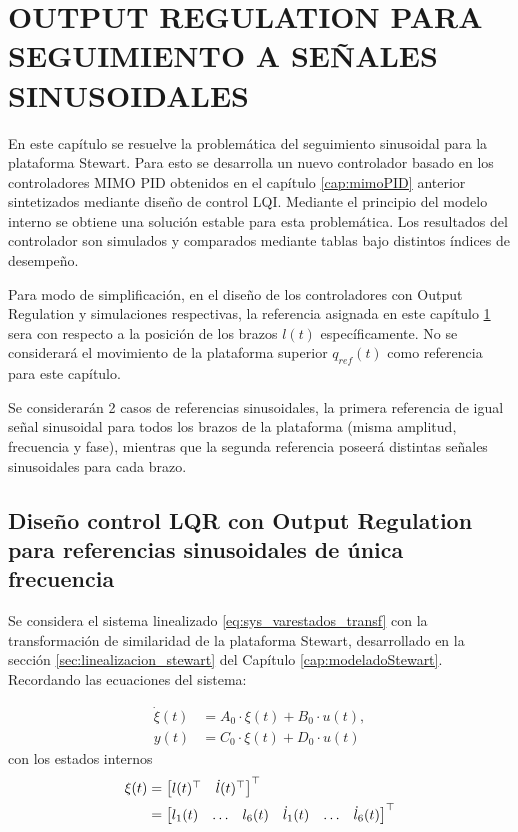 \chapter{OUTPUT REGULATION PARA SEGUIMIENTO A SEÑALES SINUSOIDALES}
\label{cap:OutputRegulation}

En este capítulo se resuelve la problemática del seguimiento sinusoidal para la plataforma Stewart. Para esto se desarrolla un nuevo controlador basado en los controladores MIMO PID obtenidos en el capítulo \ref{cap:mimoPID} anterior sintetizados mediante diseño de control LQI. Mediante el principio del modelo interno se obtiene una solución estable para esta problemática. Los resultados del controlador son simulados y comparados mediante tablas bajo distintos índices de desempeño. 

Para modo de simplificación, en el diseño de los controladores con Output Regulation y simulaciones respectivas, la referencia asignada en este capítulo \ref{cap:OutputRegulation} sera con respecto a la posición de los brazos $l(t)$ específicamente. No se considerará el movimiento de la plataforma superior $q_{ref}(t)$ como referencia para este capítulo. 

Se considerarán 2 casos de referencias sinusoidales, la primera referencia de igual señal sinusoidal para todos los brazos de la plataforma (misma amplitud, frecuencia y fase), mientras que la segunda referencia poseerá distintas señales sinusoidales para cada brazo.

\newpage
\section{Diseño control LQR con Output Regulation para referencias sinusoidales de única frecuencia}
\label{sec:LQR_outputRegulation_frec_fija}

Se considera el sistema linealizado \ref{eq:sys_varestados_transf} con la transformación de similaridad de la plataforma Stewart, desarrollado en la sección \ref{sec:linealizacion_stewart} del Capítulo \ref{cap:modeladoStewart}. Recordando las ecuaciones del sistema:

\begin{subequations} \label{eq:sysStewart_outputregulation}
    \begin{align}
        \Dot{\xi}(t) & = A_0 \cdot \xi(t) + B_0 \cdot u(t), \\
        y(t) & = C_0 \cdot \xi(t) + D_0 \cdot u(t)
    \end{align}    
\end{subequations}
con los estados internos
\begin{align} 
    \xi (t) & = \begin{bmatrix}
        l(t)^{\top} & \dot{l}(t)^{\top}
    \end{bmatrix}^{\top} \notag \\
    & = \begin{bmatrix}
        l_1(t) & \hdots & l_6(t) & \dot{l}_1(t) & \hdots & \dot{l}_6(t)
    \end{bmatrix}^{\top}
\end{align}

